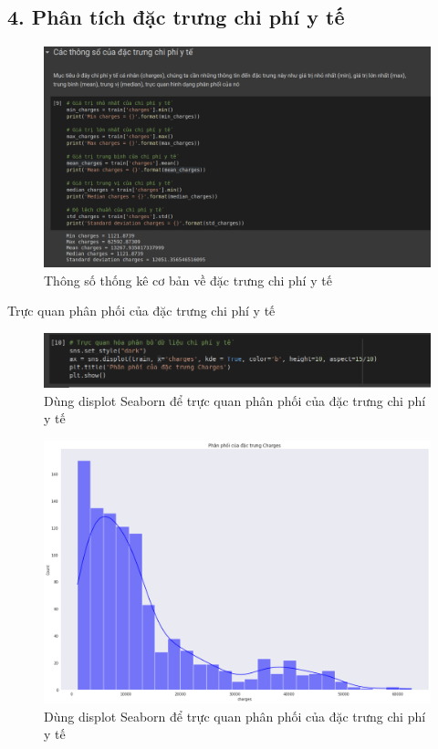 \documentclass{article}
\begin{document}
	\subsection{4. Phân tích đặc trưng chi phí y tế}
	\begin{figure}[H]
		\centering
		\includegraphics[width=1\textwidth]{images/medical_charges.png}
		\caption{Thông số thống kê cơ bản về đặc trưng chi phí y tế}
		\label{fig:writing-thesis}
	\end{figure}
	Trực quan phân phối của đặc trưng chi phí y tế
	\begin{figure}[H]
		\centering
		\includegraphics[width=1\textwidth]{images/dist_medical_charges.png}
		\caption{Dùng displot Seaborn để trực quan phân phối của đặc trưng chi phí y tế}
		\label{fig:writing-thesis}
	\end{figure}

	\begin{figure}[H]
		\centering
		\includegraphics[width=1\textwidth]{images/dist_medical_charges_plot.png}
		\caption{Dùng displot Seaborn để trực quan phân phối của đặc trưng chi phí y tế}
		\label{fig:writing-thesis}
	\end{figure}
\end{document}
